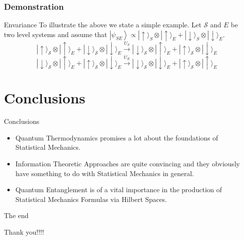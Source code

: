 \documentclass[handout]{beamer}
\begin{document}
\subsubsection{Demonstration}

\begin{frame}{Envariance}
To illustrate the above we state a simple example. Let $\mathcal{S}$ and $E$ be two level systems and assume that $\left|\psi_{SE}\right\rangle \propto|\uparrow\rangle_{S} \otimes|\uparrow\rangle_{E}+|\downarrow\rangle_{S} \otimes|\downarrow\rangle_{E}$. 
\begin{equation}
|\uparrow\rangle_{\mathcal{S}} \otimes|\uparrow\rangle_{E}+|\downarrow\rangle_{\mathcal{S}} \otimes|\downarrow\rangle_{E} \stackrel{U_{\mathcal{S}}}{\longrightarrow}|\downarrow\rangle_{\mathcal{S}} \otimes|\uparrow\rangle_{E}+|\uparrow\rangle_{\mathcal{S}} \otimes|\downarrow\rangle_{E}
\end{equation}
\begin{equation}
|\downarrow\rangle_{\mathcal{S}} \otimes|\uparrow\rangle_{E}+|\uparrow\rangle_{\mathcal{S}} \otimes|\downarrow\rangle_{E} \stackrel{U_{E}}{\longrightarrow}|\downarrow\rangle_{\mathcal{S}} \otimes|\downarrow\rangle_{E}+|\uparrow\rangle_{\mathcal{S}} \otimes|\uparrow\rangle_{E}
\end{equation}
\end{frame}
\section{Conclusions}
\begin{frame}{Conclusions}
\begin{itemize}
\item Quantum Thermodynamics promises a lot about the foundations of Statistical Mechanics.
\item Information Theoretic Approaches are quite convincing and they obviously have something to do with Statistical Mechanics in general.
\item Quantum Entanglement is of a vital importance in the production of Statistical Mechanics Formulas via Hilbert Spaces.
\end{itemize}
\end{frame}
\begin{frame}{The end}
\begin{center}
\Huge Thank you!!!!
\end{center}
\end{frame}
\end{document}
